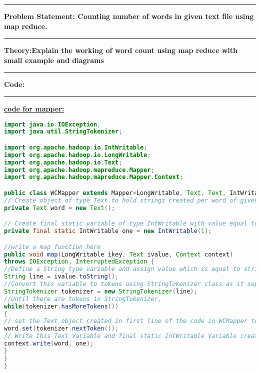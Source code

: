 \documentclass[11pt,article]{memoir}
\begin{document}
\begin{flushleft}
    \pagebreak


\maketitle

\hrule \vspace{0.2cm}
\textbf{Problem Statement: Counting number of words in given text file using map reduce.}\hrule\vspace{0.2cm}
\textbf{Theory:Explain the working of word count using map reduce with small example and diagrams}\hrule\vspace{0.2cm}
\afterpage{\newpage~\newpage}\newpage
\textbf{Code:}\hrule
\vspace{0.5cm}
\textbf{\underline{code for mapper:}}

\begin{lstlisting}[language=java]
import java.io.IOException;
import java.util.StringTokenizer;

import org.apache.hadoop.io.IntWritable;
import org.apache.hadoop.io.LongWritable;
import org.apache.hadoop.io.Text;
import org.apache.hadoop.mapreduce.Mapper;
import org.apache.hadoop.mapreduce.Mapper.Context;

public class WCMapper extends Mapper<LongWritable, Text, Text, IntWritable> {
// Create object of type Text to hold strings created per word of given document
private Text word = new Text();

// Create final static variable of type IntWritable with value equal to 1 as according to algorithm map function puts 1 for each word encountered.
private final static IntWritable one = new IntWritable(1);

//write a map function here
public void map(LongWritable ikey, Text ivalue, Context context)
throws IOException, InterruptedException {
//Define a String type variable and assign value which is equal to string equivalent of Text value passed to map function
String line = ivalue.toString();
//Convert this variable to tokens using StringTokenizer class as it separates out each word of the document
StringTokenizer tokenizer = new StringTokenizer(line);
//Until there are tokens in StringTokenizer, 
while(tokenizer.hasMoreTokens()) 
{
// set the Text object created in first line of the code in WCMapper to next token in the StringTokenizer
word.set(tokenizer.nextToken());
// Write this Text Variable and final static IntWritable Variable created to the context so that key-value pairs are generated.
context.write(word, one);
}
}
}
	

\end{lstlisting}
\end{flushleft}
\end{document}
